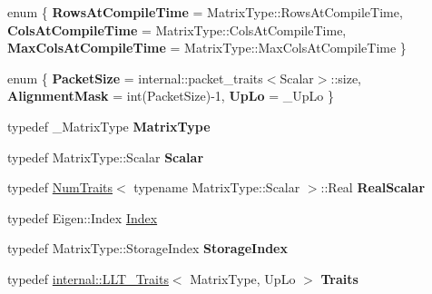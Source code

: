\begin{DoxyCompactItemize}
\item 
\mbox{\label{class_eigen_1_1_l_l_t_a32d161866883f63643e16b51becbe392}} 
enum \{ {\bfseries Rows\+At\+Compile\+Time} = Matrix\+Type\+::Rows\+At\+Compile\+Time, 
{\bfseries Cols\+At\+Compile\+Time} = Matrix\+Type\+::Cols\+At\+Compile\+Time, 
{\bfseries Max\+Cols\+At\+Compile\+Time} = Matrix\+Type\+::Max\+Cols\+At\+Compile\+Time
 \}
\item 
\mbox{\label{class_eigen_1_1_l_l_t_ad50592a8c1c8e58004ace54aaaffe663}} 
enum \{ {\bfseries Packet\+Size} = internal\+::packet\+\_\+traits$<$Scalar$>$\+::size, 
{\bfseries Alignment\+Mask} = int(Packet\+Size)-\/1, 
{\bfseries Up\+Lo} = \+\_\+\+Up\+Lo
 \}
\item 
\mbox{\label{class_eigen_1_1_l_l_t_a51ef18ef9163d74028f6cb6d967a9242}} 
typedef \+\_\+\+Matrix\+Type {\bfseries Matrix\+Type}
\item 
\mbox{\label{class_eigen_1_1_l_l_t_ac3e9cca0fd73cbe446f5ee562386a934}} 
typedef Matrix\+Type\+::\+Scalar {\bfseries Scalar}
\item 
\mbox{\label{class_eigen_1_1_l_l_t_a83aa63243f80d1d99fe0d2a91a5a157f}} 
typedef \mbox{\hyperlink{struct_eigen_1_1_num_traits}{Num\+Traits}}$<$ typename Matrix\+Type\+::\+Scalar $>$\+::Real {\bfseries Real\+Scalar}
\item 
typedef Eigen\+::\+Index \mbox{\hyperlink{class_eigen_1_1_l_l_t_ac7a64274814fa76e8b1e9e945546037f}{Index}}
\item 
\mbox{\label{class_eigen_1_1_l_l_t_ae946bd1d4fb9bc01f4a51b9007a32c1a}} 
typedef Matrix\+Type\+::\+Storage\+Index {\bfseries Storage\+Index}
\item 
\mbox{\label{class_eigen_1_1_l_l_t_a61954c19216610f6d6da9a816de03e2e}} 
typedef \mbox{\hyperlink{struct_eigen_1_1internal_1_1_l_l_t___traits}{internal\+::\+L\+L\+T\+\_\+\+Traits}}$<$ Matrix\+Type, Up\+Lo $>$ {\bfseries Traits}
\end{DoxyCompactItemize}
